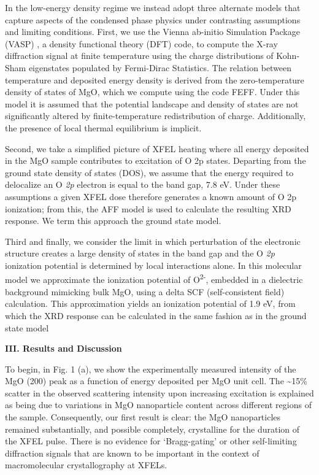 In the low-energy density regime we instead adopt three alternate models
that capture aspects of the condensed phase physics under contrasting
assumptions and limiting conditions. First, we use the Vienna ab-initio
Simulation Package (VASP) \cite{HAFNER2008AB}, a density functional theory (DFT)
code, to compute the X-ray diffraction signal at finite temperature
using the charge distributions of Kohn-Sham eigenstates populated by
Fermi-Dirac Statistics. The relation between temperature and deposited
energy density is derived from the zero-temperature density of states of
MgO, which we compute using the code FEFF. \cite{ANKUDINOV1998REAL} Under this model it
is assumed that the potential landscape and density of states are not
significantly altered by finite-temperature redistribution of charge.
Additionally, the presence of local thermal equilibrium is implicit.

Second, we take a simplified picture of XFEL heating where all energy
deposited in the MgO sample contributes to excitation of O 2p states.
Departing from the ground state density of states (DOS), we assume that
the energy required to delocalize an O \emph{2p} electron is equal to
the band gap, 7.8 eV. Under these assumptions a given XFEL dose
therefore generates a known amount of O 2p ionization; from this, the
AFF model is used to calculate the resulting XRD response. We term this
approach the ground state model.

Third and finally, we consider the limit in which perturbation of the
electronic structure creates a large density of states in the band gap
and the O \emph{2p} ionization potential is determined by local
interactions alone. In this molecular model we approximate the
ionization potential of O\textsuperscript{2-}, embedded in a dielectric
background mimicking bulk MgO, using a delta SCF (self-consistent field)
calculation. \cite{NEESE2006CRITICAL} This approximation yields an ionization potential
of 1.9 eV, from which the XRD response can be calculated in the same
fashion as in the ground state model

\textbf{III. Results and Discussion}

To begin, in Fig. 1 (a), we show the experimentally measured intensity
of the MgO (200) peak as a function of energy deposited per MgO unit
cell. The \textasciitilde{}15\% scatter in the observed scattering
intensity upon increasing excitation is explained as being due to
variations in MgO nanoparticle content across different regions of the
sample. Consequently, our first result is clear: the MgO nanoparticles
remained substantially, and possible completely, crystalline for the
duration of the XFEL pulse. There is no evidence for `Bragg-gating' or
other self-limiting diffraction signals that are known to be important
in the context of macromolecular crystallography at XFELs. \cite{CALEMAN2015ULTRAFAST}

